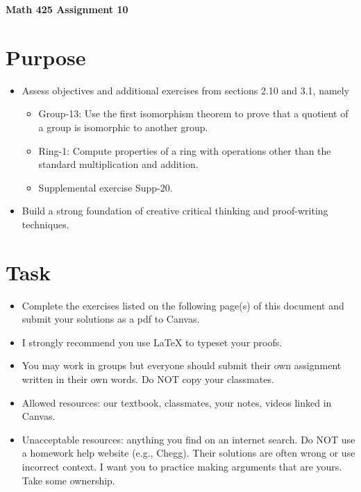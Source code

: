 \documentclass[12pt]{article}
\begin{document}
	\begin{center}
		{\Large \bf Math 425 Assignment 10}
	\end{center}
	\section*{Purpose}
	\begin{itemize}
		\item Assess objectives and additional exercises from sections 2.10 and 3.1, namely
		\begin{itemize} 
			\item Group-13: Use the first isomorphism theorem to prove that a quotient of a group is isomorphic to another group.
			\item Ring-1: Compute properties of a ring with operations other than the standard multiplication and addition.
			\item Supplemental exercise Supp-20.
		\end{itemize}
		\item Build a strong foundation of creative critical thinking and proof-writing techniques.
	\end{itemize}
	\section*{Task}
	\begin{itemize}
		\item Complete the exercises listed on the following page(s) of this document and submit your solutions as a pdf to Canvas.
		\item I strongly recommend you use LaTeX to typeset your proofs.
		\item You may work in groups but everyone should submit their own assignment written in their own words.  Do NOT copy your classmates.
		\item Allowed resources: our textbook, classmates, your notes, videos linked in Canvas.
		\item Unacceptable resources: anything you find on an internet search. Do NOT use a homework help website (e.g., Chegg). Their solutions are often wrong or use incorrect context.  I want you to practice making arguments that are yours. Take some ownership.
	\end{itemize}
\end{document}
